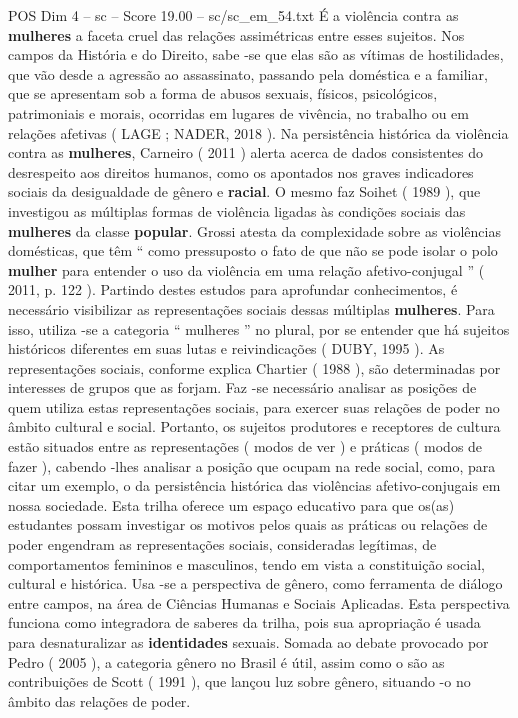 \begin{textsample}{POS Dim 4 – sc – Score 19.00 – sc/sc\_em\_54.txt}
É a violência contra as \textbf{mulheres} a faceta cruel das relações assimétricas entre esses sujeitos.
Nos campos da História e do Direito, sabe -se que elas são as vítimas de hostilidades, que vão desde a agressão ao assassinato, passando pela doméstica e a familiar, que se apresentam sob a forma de abusos sexuais, físicos, psicológicos, patrimoniais e morais, ocorridas em lugares de vivência, no trabalho ou em relações afetivas ( LAGE ; NADER, 2018 ).
Na persistência histórica da violência contra as \textbf{mulheres}, Carneiro ( 2011 ) alerta acerca de dados consistentes do desrespeito aos direitos humanos, como os apontados nos graves indicadores sociais da desigualdade de gênero e \textbf{racial}.
O mesmo faz Soihet ( 1989 ), que investigou as múltiplas formas de violência ligadas às condições sociais das \textbf{mulheres} da classe \textbf{popular}.
Grossi atesta da complexidade sobre as violências domésticas, que têm “ como pressuposto o fato de que não se pode isolar o polo \textbf{mulher} para entender o uso da violência em uma relação afetivo-conjugal ” ( 2011, p. 122 ).
Partindo destes estudos para aprofundar conhecimentos, é necessário visibilizar as representações sociais dessas múltiplas \textbf{mulheres}.
Para isso, utiliza -se a categoria “ mulheres ” no plural, por se entender que há sujeitos históricos diferentes em suas lutas e reivindicações ( DUBY, 1995 ).
As representações sociais, conforme explica Chartier ( 1988 ), são determinadas por interesses de grupos que as forjam.
Faz -se necessário analisar as posições de quem utiliza estas representações sociais, para exercer suas relações de poder no âmbito cultural e social.
Portanto, os sujeitos produtores e receptores de cultura estão situados entre as representações ( modos de ver ) e práticas ( modos de fazer ), cabendo -lhes analisar a posição que ocupam na rede social, como, para citar um exemplo, o da persistência histórica das violências afetivo-conjugais em nossa sociedade.
Esta trilha oferece um espaço educativo para que os(as) estudantes possam investigar os motivos pelos quais as práticas ou relações de poder engendram as representações sociais, consideradas legítimas, de comportamentos femininos e masculinos, tendo em vista a constituição social, cultural e histórica.
Usa -se a perspectiva de gênero, como ferramenta de diálogo entre campos, na área de Ciências Humanas e Sociais Aplicadas.
Esta perspectiva funciona como integradora de saberes da trilha, pois sua apropriação é usada para desnaturalizar as \textbf{identidades} sexuais.
Somada ao debate provocado por Pedro ( 2005 ), a categoria gênero no Brasil é útil, assim como o são as contribuições de Scott ( 1991 ), que lançou luz sobre gênero, situando -o no âmbito das relações de poder.

\end{textsample}
